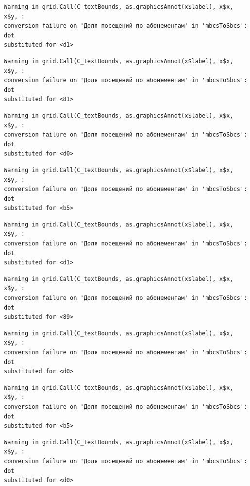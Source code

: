 \documentclass[
  letterpaper,
  DIV=11,
  numbers=noendperiod]{scrartcl}
\begin{document}
\begin{verbatim}
Warning in grid.Call(C_textBounds, as.graphicsAnnot(x$label), x$x, x$y, :
conversion failure on 'Доля посещений по абонементам' in 'mbcsToSbcs': dot
substituted for <d1>
\end{verbatim}

\begin{verbatim}
Warning in grid.Call(C_textBounds, as.graphicsAnnot(x$label), x$x, x$y, :
conversion failure on 'Доля посещений по абонементам' in 'mbcsToSbcs': dot
substituted for <81>
\end{verbatim}

\begin{verbatim}
Warning in grid.Call(C_textBounds, as.graphicsAnnot(x$label), x$x, x$y, :
conversion failure on 'Доля посещений по абонементам' in 'mbcsToSbcs': dot
substituted for <d0>
\end{verbatim}

\begin{verbatim}
Warning in grid.Call(C_textBounds, as.graphicsAnnot(x$label), x$x, x$y, :
conversion failure on 'Доля посещений по абонементам' in 'mbcsToSbcs': dot
substituted for <b5>
\end{verbatim}

\begin{verbatim}
Warning in grid.Call(C_textBounds, as.graphicsAnnot(x$label), x$x, x$y, :
conversion failure on 'Доля посещений по абонементам' in 'mbcsToSbcs': dot
substituted for <d1>
\end{verbatim}

\begin{verbatim}
Warning in grid.Call(C_textBounds, as.graphicsAnnot(x$label), x$x, x$y, :
conversion failure on 'Доля посещений по абонементам' in 'mbcsToSbcs': dot
substituted for <89>
\end{verbatim}

\begin{verbatim}
Warning in grid.Call(C_textBounds, as.graphicsAnnot(x$label), x$x, x$y, :
conversion failure on 'Доля посещений по абонементам' in 'mbcsToSbcs': dot
substituted for <d0>
\end{verbatim}

\begin{verbatim}
Warning in grid.Call(C_textBounds, as.graphicsAnnot(x$label), x$x, x$y, :
conversion failure on 'Доля посещений по абонементам' in 'mbcsToSbcs': dot
substituted for <b5>
\end{verbatim}

\begin{verbatim}
Warning in grid.Call(C_textBounds, as.graphicsAnnot(x$label), x$x, x$y, :
conversion failure on 'Доля посещений по абонементам' in 'mbcsToSbcs': dot
substituted for <d0>
\end{verbatim}
\end{document}
